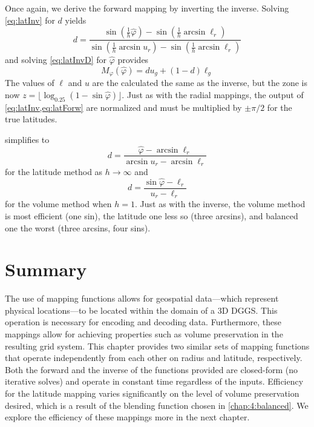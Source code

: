 Once again, we derive the forward mapping by inverting the inverse.
Solving \cref{eq:latInv} for $d$ yields
%
\begin{equation} \label{latForwD}
d = \frac{ \sin \left( \frac{1}{h} \hat{\varphi} \right) - \sin \left( \frac{1}{h} \arcsin \ell_r \right) }{ \sin \left( \frac{1}{h} \arcsin u_r \right) - \sin \left( \frac{1}{h} \arcsin \ell_r \right) }
\end{equation}
%
and solving \cref{eq:latInvD} for $\hat{\varphi}$ provides
%
\begin{equation} \label{eq:latForw}
M_\varphi (\hat{\varphi}) = d u_g + \left( 1 - d \right) \ell_g
\end{equation}
%
The values of $\ell$ and $u$ are the calculated the same as the inverse, but the zone is now $z = \lfloor \log_{0.25} ( 1 - \sin \hat{\varphi} ) \rfloor$.
Just as with the radial mappings, the output of \cref{eq:latInv,eq:latForw} are normalized and must be multiplied by $\pm \pi / 2$ for the true latitudes.


 simplifies to
%
\begin{equation*}
d = \frac{ \hat{\varphi} - \arcsin \ell_r }{ \arcsin u_r - \arcsin \ell_r}
\end{equation*}
%
for the latitude method as $h \rightarrow \infty$ and
%
\begin{equation*}
d = \frac{ \sin \hat{\varphi} - \ell_r }{ u_r - \ell_r }
\end{equation*}
%
for the volume method when $h = 1$.
Just as with the inverse, the volume method is most efficient (one sin), the latitude one less so (three arcsins), and balanced one the worst (three arcsins, four sins).


\section{Summary}
The use of mapping functions allows for geospatial data---which represent physical locations---to be located within the domain of a 3D DGGS.
This operation is necessary for encoding and decoding data.
Furthermore, these mappings allow for achieving properties such as volume preservation in the resulting grid system.
This chapter provides two similar sets of mapping functions that operate independently from each other on radius and latitude, respectively.
Both the forward and the inverse of the functions provided are closed-form (no iterative solves) and operate in constant time regardless of the inputs.
Efficiency for the latitude mapping varies significantly on the level of volume preservation desired, which is a result of the blending function chosen in \cref{chap:4:balanced}.
We explore the efficiency of these mappings more in the next chapter.
